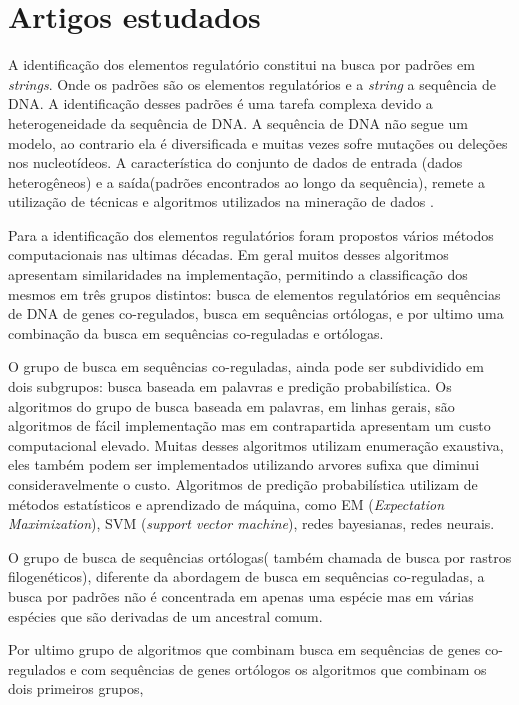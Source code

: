 \chapter{Artigos estudados}

A identificação dos elementos regulatório constitui na busca por padrões em \textit{strings}. Onde os padrões são os elementos regulatórios e a \textit{string} a sequência de DNA. A identificação desses padrões é uma tarefa complexa devido a heterogeneidade da sequência de DNA. A sequência de DNA não segue um modelo, ao contrario ela é diversificada e muitas vezes sofre mutações ou deleções nos nucleotídeos. A característica do conjunto de dados de entrada (dados heterogêneos) e a saída(padrões encontrados ao longo da sequência), remete a utilização de técnicas e algoritmos utilizados na mineração de dados . 

Para a identificação dos elementos regulatórios foram propostos vários métodos computacionais nas ultimas décadas. Em geral muitos desses algoritmos apresentam similaridades na implementação, permitindo a classificação dos mesmos em três grupos distintos: busca de elementos regulatórios em sequências de DNA de genes co-regulados, busca em sequências ortólogas, e por ultimo uma combinação da busca em sequências co-reguladas e ortólogas.

O grupo de busca em sequências co-reguladas, ainda pode ser subdividido em dois subgrupos: busca baseada em palavras e predição probabilística. Os algoritmos do grupo de busca baseada em palavras, em linhas gerais, são algoritmos de fácil implementação mas em contrapartida apresentam um custo computacional elevado. Muitas desses algoritmos utilizam enumeração exaustiva, eles também podem ser implementados utilizando arvores sufixa que diminui consideravelmente o custo. Algoritmos de predição probabilística utilizam de métodos estatísticos e aprendizado de máquina, como EM (\textit{Expectation Maximization}), SVM (\textit{support vector machine}), redes bayesianas, redes neurais. 

O grupo de busca de sequências ortólogas( também chamada de busca por rastros filogenéticos), diferente da abordagem de busca em sequências co-reguladas, a busca por padrões não é concentrada em apenas uma espécie mas em várias espécies que são derivadas de um ancestral comum.

Por ultimo  grupo de algoritmos que combinam busca em sequências de genes co-regulados e com sequências de genes ortólogos  os algoritmos que combinam os dois primeiros grupos, 


